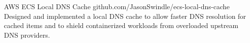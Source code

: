 \projectitem
{AWS ECS Local DNS Cache}
{github.com/JasonSwindle/ecs-local-dns-cache}
{Designed and implemented a local DNS cache to allow faster DNS resolution for cached items and to shield containerized workloads from overloaded upstream DNS providers.}